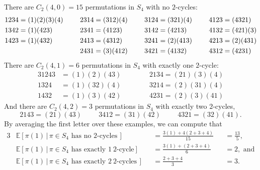 \begin{example}
\label{ex:fourLettersTwoCycles}
  There are $C_2(4,0) = 15$ permutations in $S_4$ with no $2$-cycles:
  \begin{alignat*}{5}
    1234 &= (1)(2)(3)(4) \hspace{0.5 cm}
    && 2314 = (312)(4)\hspace{0.5 cm}
    && 3124 = (321)(4)\hspace{0.5 cm}
    && 4123 = (4321) \\
%
    1342 &= (1)(423) \hspace{0.5 cm}
    && 2341 = (4123) \hspace{0.5 cm}
    && 3142 = (4213) \hspace{0.5 cm}
    && 4132 = (421)(3)\\
%
    1423 &= (1)(432) \hspace{0.5 cm}
    && 2413 = (4312) \hspace{0.5 cm}
    && 3241 = (2)(413) \hspace{0.5 cm}
    && 4213 = (2)(431) \\
%
    & \
    && 2431 = (3)(412)  \hspace{0.5 cm}
    && 3421 = (4132) \hspace{0.5 cm}
    && 4312 = (4231)
  \end{alignat*}
  There are $C_2(4,1) = 6$ permutations in $S_4$ with exactly one $2$-cycle:
  \begin{alignat*}{3}
    1243 &= (1)(2)(43) \hspace{1cm}
    && 2134 = (21)(3)(4) \\
%
    1324 &= (1)(32)(4) \hspace{1cm}
    && 3214 = (2)(31)(4)\\
%
    1432 &= (1)(3)(42) \hspace{1cm}
    && 4231 = (2)(3)(41)
  \end{alignat*}
  And there are $C_2(4,2) = 3$ permutations in $S_4$ with exactly two $2$-cycles,
  \begin{equation*}
    2143 = (21)(43) \hspace{1cm}
    3412 = (31)(42) \hspace{1cm}
    4321 = (32)(41).
  \end{equation*}
  By averaging the first letter over these examples, we can
  compute that \begin{alignat*}{3}
    &\mathbb{E}[\pi(1)\, |\, \pi \in S_4 \text{ has no } 2 \text{-cycles}\,]
      &&= \frac{3(1) + 4(2 + 3 + 4)}{15}
      &&= \frac{13}{5},
    \\
    &\mathbb{E}[\pi(1)\, |\, \pi \in S_4 \text{ has exactly } 1\ 2 \text{-cycle}]
      &&= \frac{3(1) + (2 + 3 + 4)}{6}
      &&= 2, \text{ and}
    \\
    &\mathbb{E}[\pi(1)\, |\, \pi \in S_4 \text{ has exactly } 2\ 2 \text{-cycles}\,]
      &&= \frac{2 + 3 + 4}{3}
      &&= 3.
  \end{alignat*}
\end{example}
